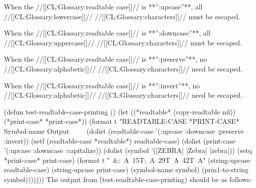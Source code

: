 When the //[[CL:Glossary:readtable case]]// is **'':upcase''**, all //[[CL:Glossary:lowercase]]// //[[CL:Glossary:characters]]// must be escaped.


When the //[[CL:Glossary:readtable case]]// is **'':downcase''**, all //[[CL:Glossary:uppercase]]// //[[CL:Glossary:characters]]// must be escaped.


When the //[[CL:Glossary:readtable case]]// is **'':preserve''**,  no //[[CL:Glossary:alphabetic]]// //[[CL:Glossary:characters]]// need be escaped.


When the //[[CL:Glossary:readtable case]]// is **'':invert''**, no //[[CL:Glossary:alphabetic]]// //[[CL:Glossary:characters]]// need be escaped.

\endlist    

 

\code
 (defun test-readtable-case-printing ()
   (let ((*readtable* (copy-readtable nil))
         (*print-case* *print-case*))
     (format t "READTABLE-CASE *PRINT-CASE*  Symbol-name  Output~
              ~%
              ~%
     (dolist (readtable-case '(:upcase :downcase :preserve :invert))
       (setf (readtable-case *readtable*) readtable-case)
       (dolist (print-case '(:upcase :downcase :capitalize))
         (dolist (symbol '(|ZEBRA| |Zebra| |zebra|))
           (setq *print-case* print-case)
           (format t "~&:~A~15T:~A~29T~A~42T~A"
                   (string-upcase readtable-case)
                   (string-upcase print-case)
                   (symbol-name symbol)
                   (prin1-to-string symbol))))))) \endcode
  The output from \f{(test-readtable-case-printing)} should be as follows:

